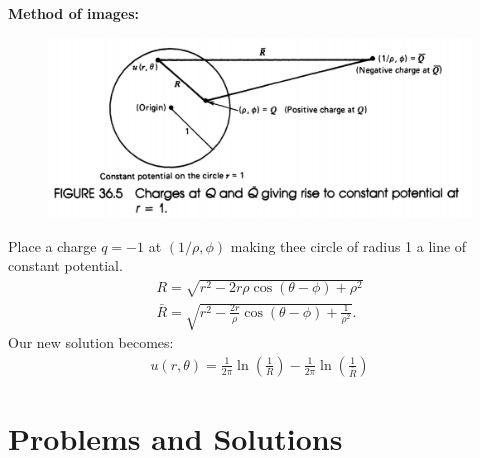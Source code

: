 \documentclass{article}
\theoremstyle{definition}
\newcommand{\f}[2]{\frac{#1}{#2}}
\newcommand{\lp}{\left(}
\newcommand{\rp}{\right)}
\begin{document}
\textbf{Method of images:} 
\begin{figure}[h!]
	\centering
	\includegraphics[scale=0.5]{charge2.png}
\end{figure}
Place a charge $q=-1$ at $(1/\rho,\phi)$ making thee circle of radius 1 a line of constant potential. 
\begin{align*}
R = \sqrt{r^2 -2r\rho\cos(\theta-\phi) + \rho^2}\\
\bar{R} = \sqrt{r^2 - \f{2r}{\rho}\cos(\theta - \phi) + \f{1}{\rho^2}}.
\end{align*}
Our new solution becomes:
\begin{align*}
u(r,\theta) = \f{1}{2\pi}\ln\lp \f{1}{R} \rp - \f{1}{2\pi}\ln\lp \f{1}{\bar{R}} \rp
\end{align*}























































\newpage

\section{Problems and Solutions}
\end{document}
